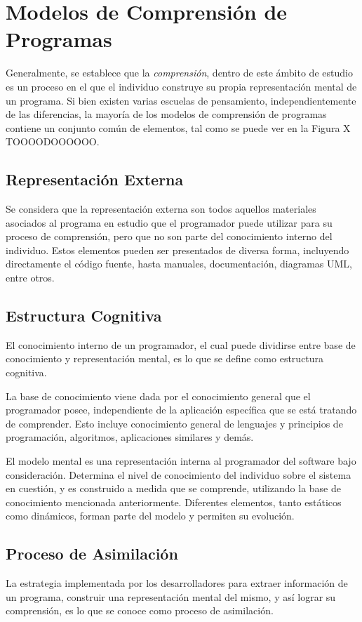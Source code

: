 \section{Modelos de Comprensión de Programas}

Generalmente, se establece que la \textit{comprensión}, dentro de este ámbito de estudio es un
proceso en el que el individuo construye su propia representación mental de un programa.
Si bien existen varias escuelas de pensamiento, independientemente de las diferencias, la
mayoría de los modelos de comprensión de programas contiene un conjunto común de elementos,
tal como se puede ver en la Figura X TOOOODOOOOOO.

\subsection{Representación Externa}
Se considera que la representación externa son todos aquellos materiales asociados al programa
en estudio que el programador puede utilizar para su proceso de comprensión, pero que no son 
parte del conocimiento interno del individuo.
Estos elementos pueden ser presentados de diversa forma, incluyendo directamente el código fuente,
hasta manuales, documentación, diagramas UML, entre otros.

\subsection{Estructura Cognitiva}
El conocimiento interno de un programador, el cual puede dividirse entre base de conocimiento
y representación mental, es lo que se define como estructura cognitiva.

La base de conocimiento viene dada por el conocimiento general que el programador posee,
independiente de la aplicación específica que se está tratando de comprender.
Esto incluye conocimiento general de lenguajes y principios de programación, algoritmos, 
aplicaciones similares y demás.

El modelo mental es una representación interna al programador del software bajo consideración.
Determina el nivel de conocimiento del individuo sobre el sistema en cuestión, y es construido
a medida que se comprende, utilizando la base de conocimiento mencionada anteriormente.
Diferentes elementos, tanto estáticos como dinámicos, forman parte del modelo y permiten
su evolución.\cite{MayrhauserVans95}

\subsection{Proceso de Asimilación}
La estrategia implementada por los desarrolladores para extraer información de un programa, 
construir una representación mental del mismo, y así lograr su comprensión, es lo que se
conoce como proceso de asimilación.

